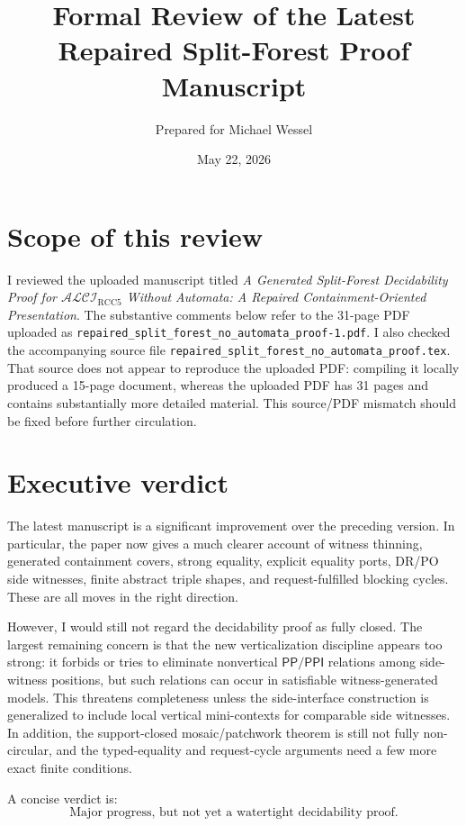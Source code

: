 \documentclass[11pt]{article}
\title{Formal Review of the Latest Repaired Split-Forest Proof Manuscript}
\author{Prepared for Michael Wessel}
\date{May 22, 2026}
\newcommand{\ALCIRCC}{\mathcal{ALCI}_{\mathrm{RCC5}}}
\newcommand{\PP}{\mathsf{PP}}
\newcommand{\PPI}{\mathsf{PPI}}
\begin{document}
\maketitle

\section*{Scope of this review}

I reviewed the uploaded manuscript titled
\emph{A Generated Split-Forest Decidability Proof for $\ALCIRCC$ Without Automata: A Repaired Containment-Oriented Presentation}.
The substantive comments below refer to the 31-page PDF uploaded as
\texttt{repaired\_split\_forest\_no\_automata\_proof-1.pdf}.
I also checked the accompanying source file
\texttt{repaired\_split\_forest\_no\_automata\_proof.tex}.  That source does not appear to reproduce the uploaded PDF: compiling it locally produced a 15-page document, whereas the uploaded PDF has 31 pages and contains substantially more detailed material.  This source/PDF mismatch should be fixed before further circulation.

\section*{Executive verdict}

The latest manuscript is a significant improvement over the preceding version.  In particular, the paper now gives a much clearer account of witness thinning, generated containment covers, strong equality, explicit equality ports, DR/PO side witnesses, finite abstract triple shapes, and request-fulfilled blocking cycles.  These are all moves in the right direction.

However, I would still not regard the decidability proof as fully closed.  The largest remaining concern is that the new verticalization discipline appears too strong: it forbids or tries to eliminate nonvertical $\PP/\PPI$ relations among side-witness positions, but such relations can occur in satisfiable witness-generated models.  This threatens completeness unless the side-interface construction is generalized to include local vertical mini-contexts for comparable side witnesses.  In addition, the support-closed mosaic/patchwork theorem is still not fully non-circular, and the typed-equality and request-cycle arguments need a few more exact finite conditions.

A concise verdict is:
\[
\boxed{\text{Major progress, but not yet a watertight decidability proof.}}
\]
\end{document}
